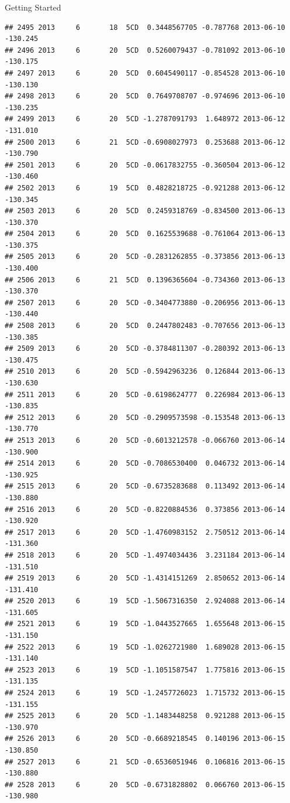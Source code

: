\documentclass[
  ignorenonframetext,
]{beamer}
\begin{document}
\begin{frame}[fragile]{Getting Started}
\begin{verbatim}
## 2495 2013     6       18  5CD  0.3448567705 -0.787768 2013-06-10 -130.245
## 2496 2013     6       20  5CD  0.5260079437 -0.781092 2013-06-10 -130.175
## 2497 2013     6       20  5CD  0.6045490117 -0.854528 2013-06-10 -130.130
## 2498 2013     6       20  5CD  0.7649708707 -0.974696 2013-06-10 -130.235
## 2499 2013     6       20  5CD -1.2787091793  1.648972 2013-06-12 -131.010
## 2500 2013     6       21  5CD -0.6908027973  0.253688 2013-06-12 -130.790
## 2501 2013     6       20  5CD -0.0617832755 -0.360504 2013-06-12 -130.460
## 2502 2013     6       19  5CD  0.4828218725 -0.921288 2013-06-12 -130.345
## 2503 2013     6       20  5CD  0.2459318769 -0.834500 2013-06-13 -130.370
## 2504 2013     6       20  5CD  0.1625539688 -0.761064 2013-06-13 -130.375
## 2505 2013     6       20  5CD -0.2831262855 -0.373856 2013-06-13 -130.400
## 2506 2013     6       21  5CD  0.1396365604 -0.734360 2013-06-13 -130.370
## 2507 2013     6       20  5CD -0.3404773880 -0.206956 2013-06-13 -130.440
## 2508 2013     6       20  5CD  0.2447802483 -0.707656 2013-06-13 -130.385
## 2509 2013     6       20  5CD -0.3784811307 -0.280392 2013-06-13 -130.475
## 2510 2013     6       20  5CD -0.5942963236  0.126844 2013-06-13 -130.630
## 2511 2013     6       20  5CD -0.6198624777  0.226984 2013-06-13 -130.835
## 2512 2013     6       20  5CD -0.2909573598 -0.153548 2013-06-13 -130.770
## 2513 2013     6       20  5CD -0.6013212578 -0.066760 2013-06-14 -130.900
## 2514 2013     6       20  5CD -0.7086530400  0.046732 2013-06-14 -130.925
## 2515 2013     6       20  5CD -0.6735283688  0.113492 2013-06-14 -130.880
## 2516 2013     6       20  5CD -0.8220884536  0.373856 2013-06-14 -130.920
## 2517 2013     6       20  5CD -1.4760983152  2.750512 2013-06-14 -131.360
## 2518 2013     6       20  5CD -1.4974034436  3.231184 2013-06-14 -131.510
## 2519 2013     6       20  5CD -1.4314151269  2.850652 2013-06-14 -131.410
## 2520 2013     6       19  5CD -1.5067316350  2.924088 2013-06-14 -131.605
## 2521 2013     6       19  5CD -1.0443527665  1.655648 2013-06-15 -131.150
## 2522 2013     6       19  5CD -1.0262721980  1.689028 2013-06-15 -131.140
## 2523 2013     6       19  5CD -1.1051587547  1.775816 2013-06-15 -131.135
## 2524 2013     6       19  5CD -1.2457726023  1.715732 2013-06-15 -131.155
## 2525 2013     6       20  5CD -1.1483448258  0.921288 2013-06-15 -130.970
## 2526 2013     6       20  5CD -0.6689218545  0.140196 2013-06-15 -130.850
## 2527 2013     6       21  5CD -0.6536051946  0.106816 2013-06-15 -130.880
## 2528 2013     6       20  5CD -0.6731828802  0.066760 2013-06-15 -130.980

\end{verbatim}
\end{frame}
\end{document}
